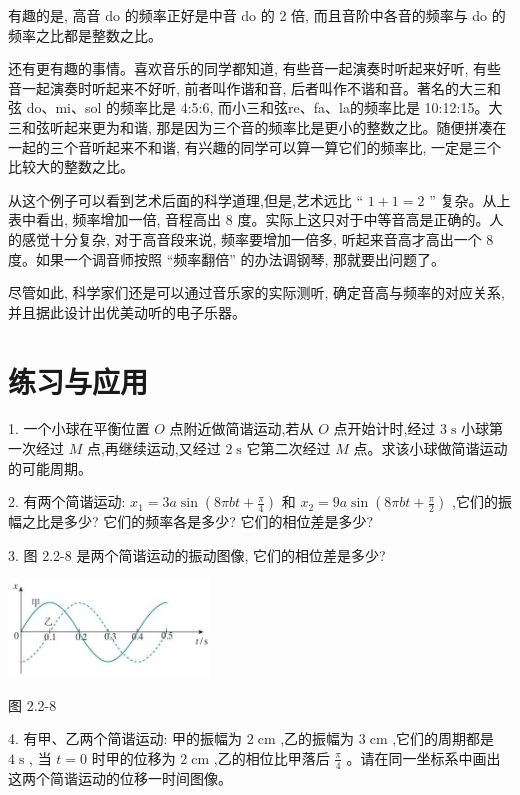 \documentclass[10pt]{article}
\begin{document}
有趣的是, 高音 do 的频率正好是中音 do 的 2 倍, 而且音阶中各音的频率与 do 的频率之比都是整数之比。

还有更有趣的事情。喜欢音乐的同学都知道, 有些音一起演奏时听起来好听, 有些音一起演奏时听起来不好听, 前者叫作谐和音, 后者叫作不谐和音。著名的大三和弦 do、mi、sol 的频率比是 4:5:6, 而小三和弦re、fa、la的频率比是 10:12:15。大三和弦听起来更为和谐, 那是因为三个音的频率比是更小的整数之比。随便拼凑在一起的三个音听起来不和谐, 有兴趣的同学可以算一算它们的频率比, 一定是三个比较大的整数之比。

从这个例子可以看到艺术后面的科学道理,但是,艺术远比 “ \(1 + 1 = 2\) ” 复杂。从上表中看出, 频率增加一倍, 音程高出 8 度。实际上这只对于中等音高是正确的。人的感觉十分复杂, 对于高音段来说, 频率要增加一倍多, 听起来音高才高出一个 8 度。如果一个调音师按照 “频率翻倍” 的办法调钢琴, 那就要出问题了。

尽管如此, 科学家们还是可以通过音乐家的实际测听, 确定音高与频率的对应关系, 并且据此设计出优美动听的电子乐器。

\section*{练习与应用}

1. 一个小球在平衡位置 \(O\) 点附近做简谐运动,若从 \(O\) 点开始计时,经过 \(3\mathrm{\;s}\) 小球第一次经过 \(M\) 点,再继续运动,又经过 \(2\mathrm{\;s}\) 它第二次经过 \(M\) 点。求该小球做简谐运动的可能周期。

2. 有两个简谐运动: \({x}_{1} = {3a}\sin \left( {{8\pi bt} + \frac{\pi }{4}}\right)\) 和 \({x}_{2} = {9a}\sin \left( {{8\pi bt} + \frac{\pi }{2}}\right)\) ,它们的振幅之比是多少? 它们的频率各是多少? 它们的相位差是多少?

3. 图 2.2-8 是两个简谐运动的振动图像, 它们的相位差是多少?

\begin{center}
\includegraphics[max width=0.4\textwidth]{images/01910e4c-ebb8-7d2c-8f2f-2375bc1d2d12_47_404649.jpg}
\end{center}

图 2.2-8

4. 有甲、乙两个简谐运动: 甲的振幅为 \(2\mathrm{\;{cm}}\) ,乙的振幅为 \(3\mathrm{\;{cm}}\) ,它们的周期都是 \(4\mathrm{\;s}\) , 当 \(t = 0\) 时甲的位移为 \(2\mathrm{\;{cm}}\) ,乙的相位比甲落后 \(\frac{\pi }{4}\) 。请在同一坐标系中画出这两个简谐运动的位移一时间图像。
\end{document}
